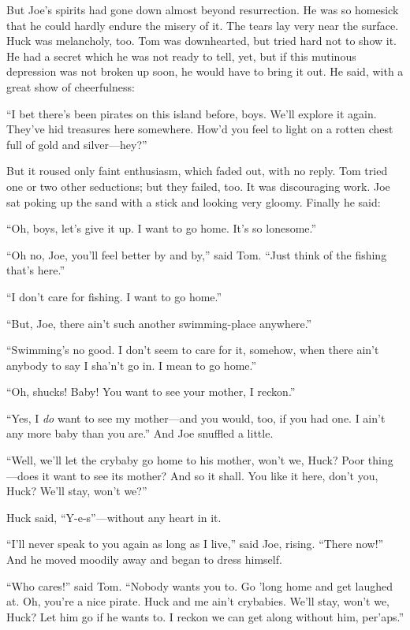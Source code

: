\documentclass{book}
\begin{document}
But Joe’s spirits had gone down almost beyond resurrection. He was so homesick that he could hardly endure the misery of it. The tears lay very near the surface. Huck was melancholy, too. Tom was downhearted, but tried hard not to show it. He had a secret which he was not ready to tell, yet, but if this mutinous depression was not broken up soon, he would have to bring it out. He said, with a great show of cheerfulness:

“I bet there’s been pirates on this island before, boys. We’ll explore it again. They’ve hid treasures here somewhere. How’d you feel to light on a rotten chest full of gold and silver—hey?”

But it roused only faint enthusiasm, which faded out, with no reply. Tom tried one or two other seductions; but they failed, too. It was discouraging work. Joe sat poking up the sand with a stick and looking very gloomy. Finally he said:

“Oh, boys, let’s give it up. I want to go home. It’s so lonesome.”

“Oh no, Joe, you’ll feel better by and by,” said Tom. “Just think of the fishing that’s here.”

“I don’t care for fishing. I want to go home.”

“But, Joe, there ain’t such another swimming-place anywhere.”

“Swimming’s no good. I don’t seem to care for it, somehow, when there ain’t anybody to say I sha’n’t go in. I mean to go home.”

“Oh, shucks! Baby! You want to see your mother, I reckon.”

“Yes, I \emph{do} want to see my mother—and you would, too, if you had one. I ain’t any more baby than you are.” And Joe snuffled a little.

“Well, we’ll let the crybaby go home to his mother, won’t we, Huck? Poor thing—does it want to see its mother? And so it shall. You like it here, don’t you, Huck? We’ll stay, won’t we?”

Huck said, “Y-e-s”—without any heart in it.

“I’ll never speak to you again as long as I live,” said Joe, rising. “There now!” And he moved moodily away and began to dress himself.

“Who cares!” said Tom. “Nobody wants you to. Go ’long home and get laughed at. Oh, you’re a nice pirate. Huck and me ain’t crybabies. We’ll stay, won’t we, Huck? Let him go if he wants to. I reckon we can get along without him, per’aps.”
\end{document}
